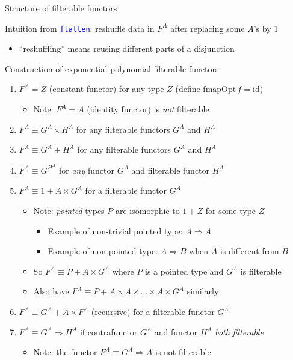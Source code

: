 \documentclass[english]{beamer}
\begin{document}
\begin{frame}{Structure of filterable functors}

Intuition from \texttt{\textcolor{blue}{\footnotesize{}flatten}}:
reshuffle data in $F^{A}$ after replacing some $A$'s by $1$
\begin{itemize}
\item ``reshuffling'' means reusing different parts of a disjunction
\end{itemize}
Construction of exponential-polynomial filterable functors 
\begin{enumerate}
\item $F^{A}=Z$ (constant functor) for any type $Z$ (define $\text{fmapOpt}\,f=\text{id}$)
\begin{itemize}
\item Note: $F^{A}=A$ (identity functor) is \emph{not} filterable
\end{itemize}
\item $F^{A}\equiv G^{A}\times H^{A}$ for any filterable functors $G^{A}$
and $H^{A}$
\item $F^{A}\equiv G^{A}+H^{A}$ for any filterable functors $G^{A}$ and
$H^{A}$
\item $F^{A}\equiv G^{H^{A}}$ for \emph{any} functor $G^{A}$ and filterable
functor $H^{A}$
\item $F^{A}\equiv1+A\times G^{A}$ for a filterable functor $G^{A}$
\begin{itemize}
\item Note: \emph{pointed} types $P$ are isomorphic to $1+Z$ for some
type $Z$
\begin{itemize}
\item Example of non-trivial pointed type: $A\Rightarrow A$
\item Example of non-pointed type: $A\Rightarrow B$ when $A$ is different
from $B$
\end{itemize}
\item So $F^{A}\equiv P+A\times G^{A}$ where $P$ is a pointed type and
$G^{A}$ is filterable
\item Also have $F^{A}\equiv P+A\times A\times...\times A\times G^{A}$
similarly
\end{itemize}
\item $F^{A}\equiv G^{A}+A\times F^{A}$ (recursive) for a filterable functor
$G^{A}$
\item $F^{A}\equiv G^{A}\Rightarrow H^{A}$ if\emph{ }contrafunctor $G^{A}$
and functor $H^{A}$ \emph{both} \emph{filterable}
\begin{itemize}
\item Note: the functor $F^{A}\equiv G^{A}\Rightarrow A$ is not filterable
\end{itemize}
\end{enumerate}
\end{frame}
\end{document}
